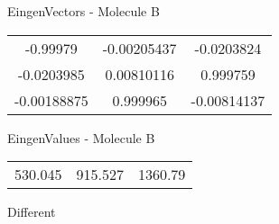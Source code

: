 \begin{multicols}{2}
\begin{center}
\vtab
 EingenVectors - Molecule B     \\
\vtab
\begin{tabular}{|c c c|}
-0.99979	 & 	-0.00205437	 & 	-0.0203824	 \\
-0.0203985	 & 	0.00810116	 & 	0.999759	 \\
-0.00188875	 & 	0.999965	 & 	-0.00814137
\end{tabular}

\vtab
 EingenValues - Molecule B     \\
\vtab
\begin{tabular}{|c c c|}
530.045	 & 	915.527	 & 	1360.79	 \\
\end{tabular}

\end{center}
\end{multicols}
\begin{center}
\vtab
\vtab
\textcolor{NavyBlue}{\Large Different}
\end{center}

 \newpage

